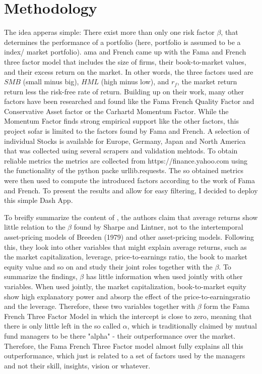 \documentclass[11pt, a4paper, leqno]{article}
\begin{document}
\section{Methodology}
The idea apperas simple: There exist more than only one risk factor $\beta$,  that determines the
performance of a portfolio (here, portfolio is assumed to be a index/ market portfolio).
ama and French came up with the Fama and French three factor model that includes
the size of firms, their book-to-market values, and their excess return on the market. In other words, 
the three factors used are $SMB$ (small minus big), $HML$ (high minus low), and $r_f$, the
market return return less the risk-free rate of return. Building up on their work, many other
factors have been researched and found like the Fama French Quality Factor and Conservative 
Asset factor or the Carhartd Momentum Factor. While the Momentum Factor finds strong 
empirical support like the other factors, this project sofar is limited to the factors 
found by Fama and French. 
A selection of individual Stocks is available for Europe, Germany, Japan and North America
that was collected using several scrapers and validation mehtods. To obtain reliable metrics
the metrics are collected from https://finance.yahoo.com
using the functionality of the python packe urllib.requests. The so obtained metrics were then 
used to compute the introduced factors according to the work of Fama and French. To present the 
results and allow for easy filtering, I decided to deploy this simple Dash App.

To breifly summarize the content of \cite{FF3}, the authors claim that average returns show little relation 
to the $\beta$ found by Sharpe and Lintner, not to the intertemporal asset-pricing models of Breeden (1979) 
and other asset-pricing models. Following this, they look into other variables that might explain average returns,
 such as the market capitalization, leverage, price-to-earnings ratio, the book to market equity
 value and so on and study their joint roles together with the $\beta$. To summarize the findings, 
 $\beta$ has little information when used jointly with other variables. When used jointly, the market capitalization,
  book-to-market equity show high explanatory power and absorp the effect of the price-to-earningsratio and the leverage.
  Therefore, these two variables together with $\beta$ form the Fama French Three Factor Model in which the intercept 
  is close to zero, meaning that there is only little left in the so called $\alpha$, which is 
  traditionally claimed by mutual fund managers to be there "alpha" - their outperformance over the market.
  Therefore, the Fama French Three Factor model almost fully explains all this outperformance, which 
  just is related to a set of factors used by the managers and not their skill, insights, vision or whatever.
\end{document}

